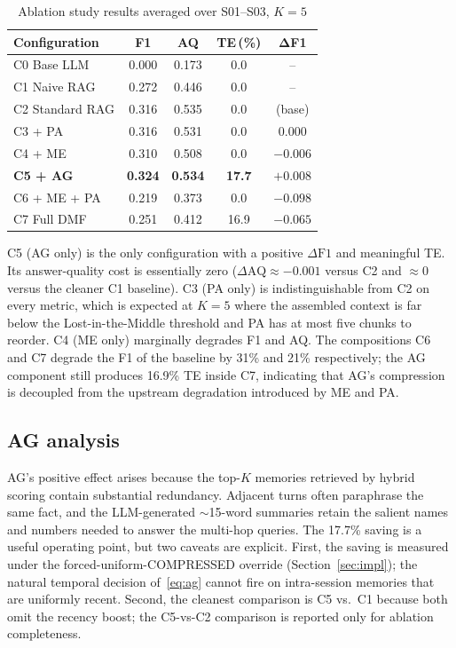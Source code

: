 \documentclass[conference]{IEEEtran}
\begin{document}
\begin{table}[t]
\caption{Ablation study results averaged over S01--S03, $K{=}5$}
\label{tab:ablation}
\centering
\renewcommand{\arraystretch}{1.05}
\begin{tabular}{@{}lcccc@{}}
\toprule
\textbf{Configuration} & \textbf{F1} & \textbf{AQ} & \textbf{TE\,(\%)} & $\boldsymbol{\Delta}$\textbf{F1} \\
\midrule
C0 Base LLM        & 0.000 & 0.173 & 0.0  & --     \\
C1 Naive RAG       & 0.272 & 0.446 & 0.0  & --     \\
C2 Standard RAG    & 0.316 & 0.535 & 0.0  & (base) \\
C3 + PA            & 0.316 & 0.531 & 0.0  & $0.000$  \\
C4 + ME            & 0.310 & 0.508 & 0.0  & $-0.006$ \\
\textbf{C5 + AG}   & \textbf{0.324} & \textbf{0.534} & \textbf{17.7} & $\boldsymbol{+0.008}$ \\
C6 + ME + PA       & 0.219 & 0.373 & 0.0  & $-0.098$ \\
C7 Full DMF        & 0.251 & 0.412 & 16.9 & $-0.065$ \\
\bottomrule
\end{tabular}
\end{table}

C5 (AG only) is the only configuration with a positive $\Delta\mathrm{F1}$ and meaningful TE. Its answer-quality cost is essentially zero ($\Delta\mathrm{AQ}\approx-0.001$ versus C2 and $\approx0$ versus the cleaner C1 baseline). C3 (PA only) is indistinguishable from C2 on every metric, which is expected at $K{=}5$ where the assembled context is far below the Lost-in-the-Middle threshold and PA has at most five chunks to reorder. C4 (ME only) marginally degrades F1 and AQ. The compositions C6 and C7 degrade the F1 of the baseline by 31\% and 21\% respectively; the AG component still produces 16.9\% TE inside C7, indicating that AG's compression is decoupled from the upstream degradation introduced by ME and PA.

\subsection{AG analysis}

AG's positive effect arises because the top-$K$ memories retrieved by hybrid scoring contain substantial redundancy. Adjacent turns often paraphrase the same fact, and the LLM-generated $\sim$15-word summaries retain the salient names and numbers needed to answer the multi-hop queries. The 17.7\% saving is a useful operating point, but two caveats are explicit. First, the saving is measured under the forced-uniform-COMPRESSED override (Section~\ref{sec:impl}); the natural temporal decision of~\eqref{eq:ag} cannot fire on intra-session memories that are uniformly recent. Second, the cleanest comparison is C5 vs.\ C1 because both omit the recency boost; the C5-vs-C2 comparison is reported only for ablation completeness.
\end{document}
